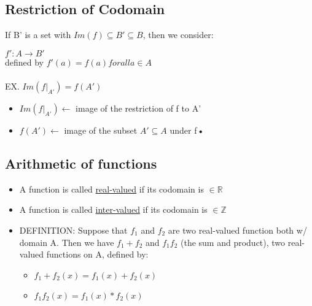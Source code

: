 \documentclass{article}
\begin{document}
\subsection{Restriction of Codomain}
If B' is a set with $Im(f) \subseteq B' \subseteq B$, then we consider:

\indent $f':A \rightarrow B'$\\
\indent defined by  $f'(a) = f(a) for all a \in A$\\ \\
\indent EX. $Im(f|_{A'}) = f(A')$\\
\begin{itemize}
\item $Im(f|_{A'}) \leftarrow$ image of the restriction of f to A'
\item $f(A') \leftarrow$ image of the subset $A' \subseteq A$ under f\textbf{•} 
\end{itemize}

\subsection{Arithmetic of functions}
\begin{itemize}
\item A function is called \underline{real-valued} if its codomain is $\in \mathbb{R}$
\item A function is called \underline{inter-valued} if its codomain is $\in \mathbb{Z}$
\item DEFINITION: Suppose that $f_{1}$ and $f_{2}$ are two real-valued function both w/ domain A. Then we have $f_{1} + f_{2}$ and $f_{1}f_{2}$ (the sum and product), two real-valued functions on A, defined by:
\begin{itemize}
\item $f_{1} + f_{2}(x) = f_{1}(x) + f_{2}(x)$
\item $f_{1}f_{2}(x) = f_{1}(x) * f_{2}(x)$
\end{itemize}
\end{itemize}








\end{document}
